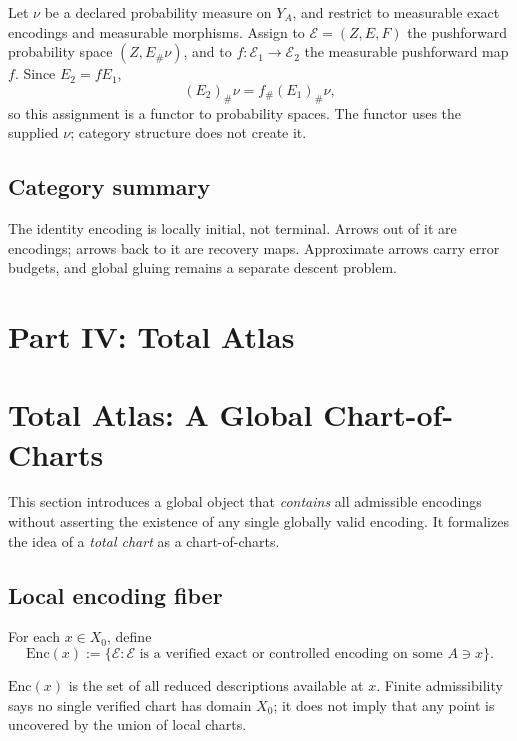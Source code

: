 \documentclass[11pt]{article}
\theoremstyle{plain}
\theoremstyle{plain}
\begin{document}
Let $\nu$ be a declared probability measure on $Y_A$, and restrict to
measurable exact encodings and measurable morphisms.  Assign to
$\mathcal E=(Z,E,F)$ the pushforward probability space
$(Z,E_\#\nu)$, and to $f:\mathcal E_1\to\mathcal E_2$ the measurable
pushforward map $f$.  Since $E_2=fE_1$,
\[
(E_2)_\#\nu=f_\#(E_1)_\#\nu,
\]
so this assignment is a functor to probability spaces.  The functor uses
the supplied $\nu$; category structure does not create it.

\subsection{Category summary}

The identity encoding is locally initial, not terminal.  Arrows out of it
are encodings; arrows back to it are recovery maps.  Approximate arrows carry
error budgets, and global gluing remains a separate descent problem.

\section*{Part IV: Total Atlas}

\section{Total Atlas: A Global Chart-of-Charts}

This section introduces a global object that \emph{contains} all admissible encodings
without asserting the existence of any single globally valid encoding.
It formalizes the idea of a \emph{total chart} as a chart-of-charts.

\subsection{Local encoding fiber}

\begin{definition}
For each $x\in X_0$, define
\[
\mathrm{Enc}(x):=
\{\mathcal E:\mathcal E\text{ is a verified exact or controlled encoding
on some }A\ni x\}.
\]
\end{definition}

\begin{remark}
$\mathrm{Enc}(x)$ is the set of all reduced descriptions available at $x$.
Finite admissibility says no single verified chart has domain $X_0$; it does
not imply that any point is uncovered by the union of local charts.
\end{remark}
\end{document}

